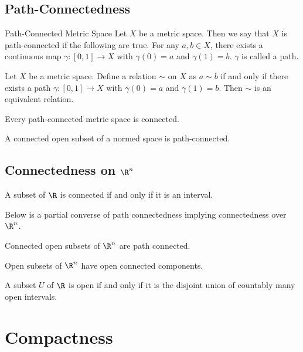 \subsection{Path-Connectedness}
\begin{defn}{Path-Connected Metric Space}{} Let $X$ be a metric space. Then we say that $X$ is path-connected if the following are true. For any $a,b\in X$, there exists a continuous map $\gamma:[0,1]\to X$ with $\gamma(0)=a$ and $\gamma(1)=b$. $\gamma$ is called a path. 
\end{defn}

\begin{lmm}{}{} Let $X$ be a metric space. Define a relation $\sim$ on $X$ as $a\sim b$ if and only if there exists a path $\gamma:[0,1]\to X$ with $\gamma(0)=a$ and $\gamma(1)=b$. Then $\sim$ is an equivalent relation. 
\end{lmm}

\begin{prp}{}{} Every path-connected metric space is connected. 
\end{prp}

\begin{prp}{}{} A connected open subset of a normed space is path-connected. 
\end{prp}

\subsection{Connectedness on $\R^n$}
\begin{thm}{}{} A subset of $\R$ is connected if and only if it is an interval. 
\end{thm}

Below is a partial converse of path connectedness implying connectedness over $\R^n$. 

\begin{thm}{}{} Connected open subsets of $\R^n$ are path connected. 
\end{thm}

\begin{thm}{}{} Open subsets of $\R^n$ have open connected components. 
\end{thm}

\begin{thm}{}{} A subset $U$ of $\R$ is open if and only if it is the disjoint union of countably many open intervals. 
\end{thm}

\pagebreak
\section{Compactness}
